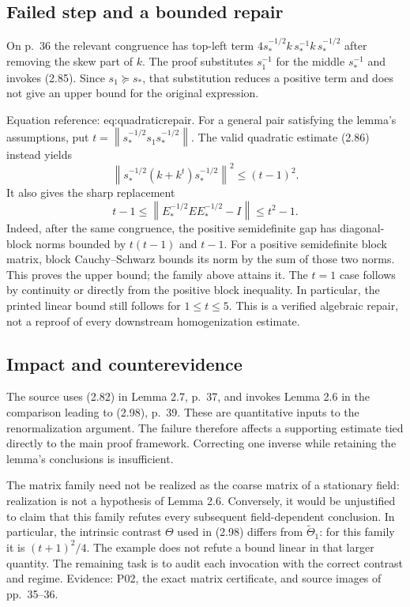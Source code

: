 \documentclass[10pt]{article}
\begin{document}
\subsection*{Failed step and a bounded repair}
On p. 36 the relevant congruence has top-left term \(4s_*^{-1/2}k\,s_*^{-1}k\,s_*^{-1/2}\) after removing the skew part of \(k\). The proof substitutes \(s_1^{-1}\) for the middle \(s_*^{-1}\) and invokes (2.85). Since \(s_1\succeq s_*\), that substitution reduces a positive term and does not give an upper bound for the original expression.\par
Equation reference: eq:quadraticrepair. For a general pair satisfying the lemma’s assumptions, put \(t=\left\lVert s_*^{-1/2}s_1s_*^{-1/2}\right\rVert\). The valid quadratic estimate (2.86) instead yields \[\left\lVert s_*^{-1/2}(k+k^t)s_*^{-1/2}\right\rVert^2\le(t-1)^2.\] It also gives the sharp replacement \[
 t-1\le
 \left\lVert E_*^{-1/2}EE_*^{-1/2}-I\right\rVert
 \le t^2-1.\] Indeed, after the same congruence, the positive semidefinite gap has diagonal-block norms bounded by \(t(t-1)\) and \(t-1\). For a positive semidefinite block matrix, block Cauchy–Schwarz bounds its norm by the sum of those two norms. This proves the upper bound; the family above attains it. The \(t=1\) case follows by continuity or directly from the positive block inequality. In particular, the printed linear bound still follows for \(1\le t\le5\). This is a verified algebraic repair, not a reproof of every downstream homogenization estimate.\par
\subsection*{Impact and counterevidence}
The source uses (2.82) in Lemma 2.7, p. 37, and invokes Lemma 2.6 in the comparison leading to (2.98), p. 39. These are quantitative inputs to the renormalization argument. The failure therefore affects a supporting estimate tied directly to the main proof framework. Correcting one inverse while retaining the lemma’s conclusions is insufficient.\par
The matrix family need not be realized as the coarse matrix of a stationary field: realization is not a hypothesis of Lemma 2.6. Conversely, it would be unjustified to claim that this family refutes every subsequent field-dependent conclusion. In particular, the intrinsic contrast \(\Theta\) used in (2.98) differs from \(\widetilde\Theta_1\): for this family it is \((t+1)^2/4\). The example does not refute a bound linear in that larger quantity. The remaining task is to audit each invocation with the correct contrast and regime. Evidence: P02, the exact matrix certificate, and source images of pp. 35–36.\par
\end{document}
